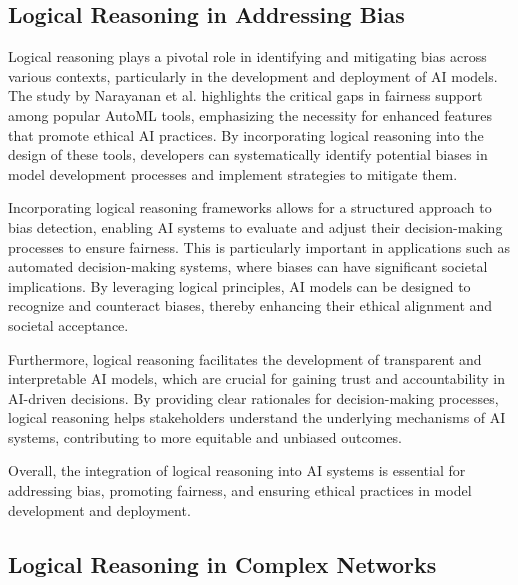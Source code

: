 \subsection{Logical Reasoning in Addressing Bias} \label{subsec:Logical Reasoning in Addressing Bias}



Logical reasoning plays a pivotal role in identifying and mitigating bias across various contexts, particularly in the development and deployment of AI models. The study by Narayanan et al. \cite{narayanan2023democratizecareneedfairness} highlights the critical gaps in fairness support among popular AutoML tools, emphasizing the necessity for enhanced features that promote ethical AI practices. By incorporating logical reasoning into the design of these tools, developers can systematically identify potential biases in model development processes and implement strategies to mitigate them.



Incorporating logical reasoning frameworks allows for a structured approach to bias detection, enabling AI systems to evaluate and adjust their decision-making processes to ensure fairness. This is particularly important in applications such as automated decision-making systems, where biases can have significant societal implications. By leveraging logical principles, AI models can be designed to recognize and counteract biases, thereby enhancing their ethical alignment and societal acceptance.



Furthermore, logical reasoning facilitates the development of transparent and interpretable AI models, which are crucial for gaining trust and accountability in AI-driven decisions. By providing clear rationales for decision-making processes, logical reasoning helps stakeholders understand the underlying mechanisms of AI systems, contributing to more equitable and unbiased outcomes.



Overall, the integration of logical reasoning into AI systems is essential for addressing bias, promoting fairness, and ensuring ethical practices in model development and deployment.



\subsection{Logical Reasoning in Complex Networks} \label{subsec:Logical Reasoning in Complex Networks}



